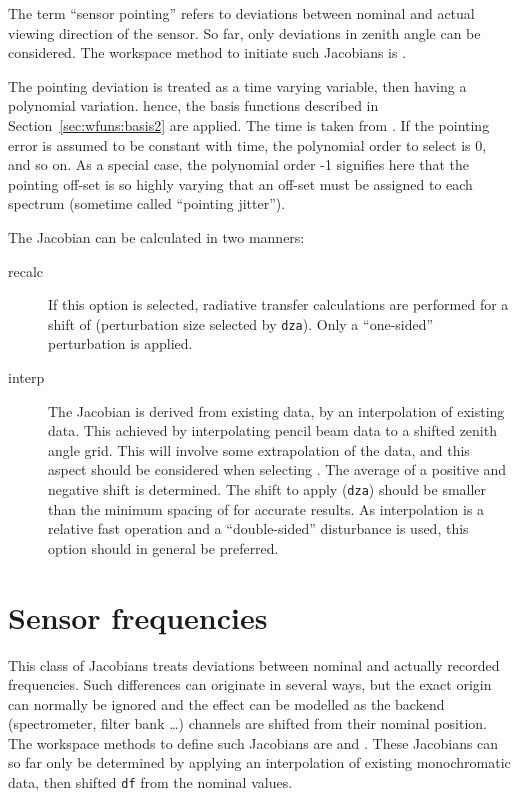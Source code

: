 The term ``sensor pointing'' refers to deviations between nominal and
actual viewing direction of the sensor. So far, only deviations in zenith angle
can be considered. The workspace method to initiate such Jacobians is
.

The pointing deviation is treated as a time varying variable, then having a
polynomial variation. hence, the basis functions described in
Section~\ref{sec:wfuns:basis2} are applied. The time is taken from
. If the pointing error is assumed to be constant with
time, the polynomial order to select is 0, and so on. As a special case, the
polynomial order -1 signifies here that the pointing off-set is so highly
varying that an off-set must be assigned to each spectrum
(sometime called ``pointing jitter'').

The Jacobian can be calculated in two manners:
\begin{description}
\item[recalc] If this option is selected, radiative transfer calculations are
  performed for a shift of  (perturbation size selected
  by \verb|dza|). Only a ``one-sided'' perturbation is applied.
\item[interp] The Jacobian is derived from existing data, by an interpolation
  of existing data. This achieved by interpolating pencil beam data to a
  shifted zenith angle grid. This will involve some extrapolation of the data,
  and this aspect should be considered when selecting
  . The average of a positive and negative shift
  is determined. The shift to apply (\verb|dza|) should be smaller than the
  minimum spacing of  for accurate results. As
  interpolation is a relative fast operation and a ``double-sided'' disturbance
  is used, this option should in general be preferred.
\end{description}




\section{Sensor frequencies}
\label{sec:wfuns:sensorfreq}

This class of Jacobians treats deviations between nominal and actually recorded
frequencies. Such differences can originate in several ways, but the exact
origin can normally be ignored and the effect can be modelled as the backend
(spectrometer, filter bank \dots) channels are shifted from their nominal
position. The workspace methods to define such Jacobians are
 and . These
Jacobians can so far only be determined by applying an interpolation of existing
monochromatic data, then shifted \verb|df| from the nominal
values.

